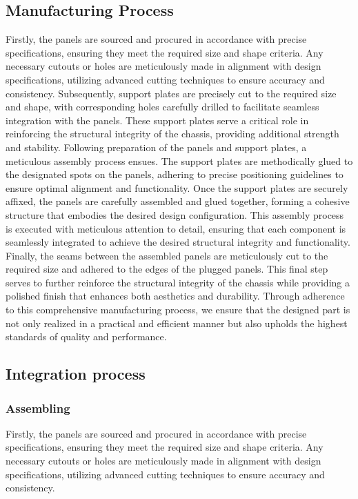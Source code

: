 \subsection{Manufacturing Process}


Firstly, the panels are sourced and procured in accordance with precise specifications, ensuring they meet the required size and shape criteria. Any necessary cutouts or holes are meticulously made in alignment with design specifications, utilizing advanced cutting techniques to ensure accuracy and consistency.
Subsequently, support plates are precisely cut to the required size and shape, with corresponding holes carefully drilled to facilitate seamless integration with the panels. These support plates serve a critical role in reinforcing the structural integrity of the chassis, providing additional strength and stability.
Following preparation of the panels and support plates, a meticulous assembly process ensues. The support plates are methodically glued to the designated spots on the panels, adhering to precise positioning guidelines to ensure optimal alignment and functionality.
Once the support plates are securely affixed, the panels are carefully assembled and glued together, forming a cohesive structure that embodies the desired design configuration. This assembly process is executed with meticulous attention to detail, ensuring that each component is seamlessly integrated to achieve the desired structural integrity and functionality.
Finally, the seams between the assembled panels are meticulously cut to the required size and adhered to the edges of the plugged panels. This final step serves to further reinforce the structural integrity of the chassis while providing a polished finish that enhances both aesthetics and durability.
Through adherence to this comprehensive manufacturing process, we ensure that the designed part is not only realized in a practical and efficient manner but also upholds the highest standards of quality and performance.



\subsection{Integration process}
\subsubsection{Assembling}


Firstly, the panels are sourced and procured in accordance with precise specifications, ensuring they meet the required size and shape criteria. Any necessary cutouts or holes are meticulously made in alignment with design specifications, utilizing advanced cutting techniques to ensure accuracy and consistency.

